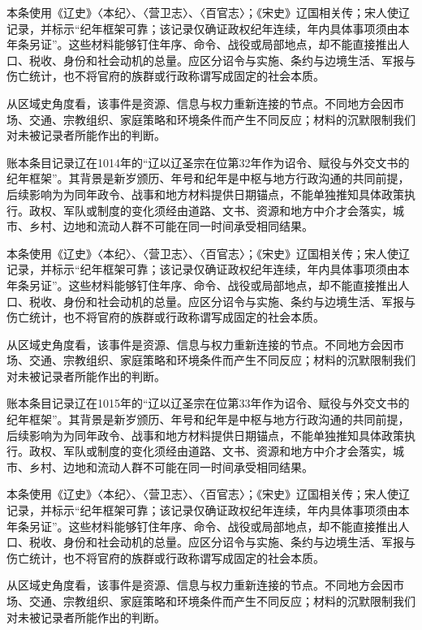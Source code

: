 本条使用《辽史》〈本纪〉、〈营卫志〉、〈百官志〉；《宋史》辽国相关传；宋人使辽记录，并标示“纪年框架可靠；该记录仅确证政权纪年连续，年内具体事项须由本年条另证”。这些材料能够钉住年序、命令、战役或局部地点，却不能直接推出人口、税收、身份和社会动机的总量。应区分诏令与实施、条约与边境生活、军报与伤亡统计，也不将官府的族群或行政称谓写成固定的社会本质。

从区域史角度看，该事件是资源、信息与权力重新连接的节点。不同地方会因市场、交通、宗教组织、家庭策略和环境条件而产生不同反应；材料的沉默限制我们对未被记录者所能作出的判断。

账本条目记录辽在1014年的“辽以辽圣宗在位第32年作为诏令、赋役与外交文书的纪年框架”。其背景是新岁颁历、年号和纪年是中枢与地方行政沟通的共同前提，后续影响为为同年政令、战事和地方材料提供日期锚点，不能单独推知具体政策执行。政权、军队或制度的变化须经由道路、文书、资源和地方中介才会落实，城市、乡村、边地和流动人群不可能在同一时间承受相同结果。

本条使用《辽史》〈本纪〉、〈营卫志〉、〈百官志〉；《宋史》辽国相关传；宋人使辽记录，并标示“纪年框架可靠；该记录仅确证政权纪年连续，年内具体事项须由本年条另证”。这些材料能够钉住年序、命令、战役或局部地点，却不能直接推出人口、税收、身份和社会动机的总量。应区分诏令与实施、条约与边境生活、军报与伤亡统计，也不将官府的族群或行政称谓写成固定的社会本质。

从区域史角度看，该事件是资源、信息与权力重新连接的节点。不同地方会因市场、交通、宗教组织、家庭策略和环境条件而产生不同反应；材料的沉默限制我们对未被记录者所能作出的判断。

账本条目记录辽在1015年的“辽以辽圣宗在位第33年作为诏令、赋役与外交文书的纪年框架”。其背景是新岁颁历、年号和纪年是中枢与地方行政沟通的共同前提，后续影响为为同年政令、战事和地方材料提供日期锚点，不能单独推知具体政策执行。政权、军队或制度的变化须经由道路、文书、资源和地方中介才会落实，城市、乡村、边地和流动人群不可能在同一时间承受相同结果。

本条使用《辽史》〈本纪〉、〈营卫志〉、〈百官志〉；《宋史》辽国相关传；宋人使辽记录，并标示“纪年框架可靠；该记录仅确证政权纪年连续，年内具体事项须由本年条另证”。这些材料能够钉住年序、命令、战役或局部地点，却不能直接推出人口、税收、身份和社会动机的总量。应区分诏令与实施、条约与边境生活、军报与伤亡统计，也不将官府的族群或行政称谓写成固定的社会本质。

从区域史角度看，该事件是资源、信息与权力重新连接的节点。不同地方会因市场、交通、宗教组织、家庭策略和环境条件而产生不同反应；材料的沉默限制我们对未被记录者所能作出的判断。

